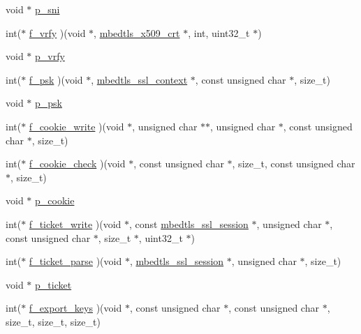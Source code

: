 \begin{DoxyCompactItemize}
\item 
void $\ast$ \mbox{\hyperlink{structmbedtls__ssl__config_a1ae68f4bd072068c60222866c0ea2f62}{p\+\_\+sni}}
\item 
int($\ast$ \mbox{\hyperlink{structmbedtls__ssl__config_ab79f1ffbe0f2ee8519f22fd6611dbb63}{f\+\_\+vrfy}} )(void $\ast$, \mbox{\hyperlink{structmbedtls__x509__crt}{mbedtls\+\_\+x509\+\_\+crt}} $\ast$, int, uint32\+\_\+t $\ast$)
\item 
void $\ast$ \mbox{\hyperlink{structmbedtls__ssl__config_ac59c71efac4d612c645e703941efae51}{p\+\_\+vrfy}}
\item 
int($\ast$ \mbox{\hyperlink{structmbedtls__ssl__config_aff5c457114c1490ab17c433d43955e34}{f\+\_\+psk}} )(void $\ast$, \mbox{\hyperlink{structmbedtls__ssl__context}{mbedtls\+\_\+ssl\+\_\+context}} $\ast$, const unsigned char $\ast$, size\+\_\+t)
\item 
void $\ast$ \mbox{\hyperlink{structmbedtls__ssl__config_ad42f2396c9758b6866d61342094a0a7d}{p\+\_\+psk}}
\item 
int($\ast$ \mbox{\hyperlink{structmbedtls__ssl__config_a362b8d558feda4b86ae8f464397e6ab2}{f\+\_\+cookie\+\_\+write}} )(void $\ast$, unsigned char $\ast$$\ast$, unsigned char $\ast$, const unsigned char $\ast$, size\+\_\+t)
\item 
int($\ast$ \mbox{\hyperlink{structmbedtls__ssl__config_a089b7c6caa6afcd078929131abf4f438}{f\+\_\+cookie\+\_\+check}} )(void $\ast$, const unsigned char $\ast$, size\+\_\+t, const unsigned char $\ast$, size\+\_\+t)
\item 
void $\ast$ \mbox{\hyperlink{structmbedtls__ssl__config_a227d50ad74b96adcc59a8fdee0f618a4}{p\+\_\+cookie}}
\item 
int($\ast$ \mbox{\hyperlink{structmbedtls__ssl__config_a4506906963c41fa4602d4959b88c7ebe}{f\+\_\+ticket\+\_\+write}} )(void $\ast$, const \mbox{\hyperlink{structmbedtls__ssl__session}{mbedtls\+\_\+ssl\+\_\+session}} $\ast$, unsigned char $\ast$, const unsigned char $\ast$, size\+\_\+t $\ast$, uint32\+\_\+t $\ast$)
\item 
int($\ast$ \mbox{\hyperlink{structmbedtls__ssl__config_a9847915b60397ff205544b6f7d2ad5ff}{f\+\_\+ticket\+\_\+parse}} )(void $\ast$, \mbox{\hyperlink{structmbedtls__ssl__session}{mbedtls\+\_\+ssl\+\_\+session}} $\ast$, unsigned char $\ast$, size\+\_\+t)
\item 
void $\ast$ \mbox{\hyperlink{structmbedtls__ssl__config_a0dab7f9f4f2c85644ebe32f8e37984dc}{p\+\_\+ticket}}
\item 
int($\ast$ \mbox{\hyperlink{structmbedtls__ssl__config_ac02042559727bfeff3dc7165019acece}{f\+\_\+export\+\_\+keys}} )(void $\ast$, const unsigned char $\ast$, const unsigned char $\ast$, size\+\_\+t, size\+\_\+t, size\+\_\+t)
$$
\end{DoxyCompactItemize}
